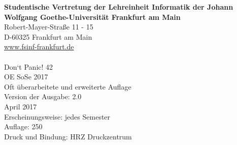 \spaltenanfang
\noindent\textbf{Studentische Vertretung der Lehreinheit Informatik der Johann Wolfgang Goethe-Universität Frankfurt am Main}\\
Robert-Mayer-Straße 11 - 15\\
D-60325 Frankfurt am Main\\
\url{www.fsinf-frankfurt.de}\\
\emailfachschaft\\
Don‘t Panic! 42\\
OE SoSe 2017\\
Oft überarbeitete und erweiterte Auflage\\
Version der Ausgabe: 2.0\\
April 2017\\
Erscheinungsweise: jedes Semester\\
Auflage: 250\\
Druck und Bindung: HRZ Druckzentrum

\spaltenende
